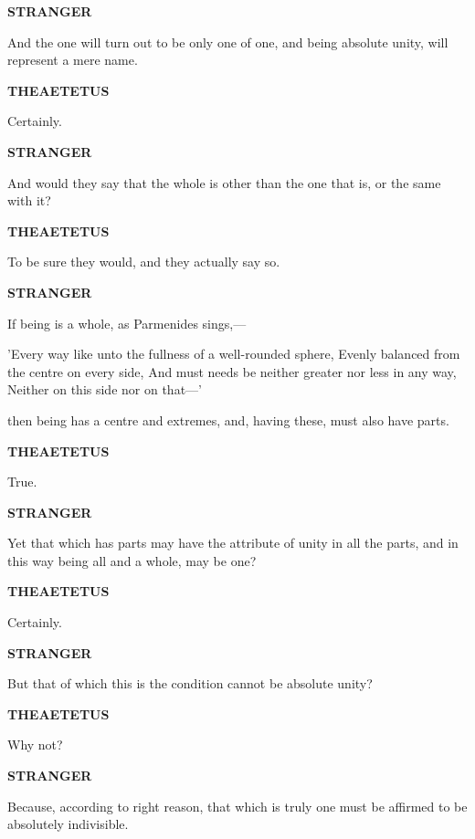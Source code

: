 \documentclass[11pt,letter]{article}
\begin{document}
\par \textbf{STRANGER}
\par   And the one will turn out to be only one of one, and being absolute unity, will represent a mere name.

\par \textbf{THEAETETUS}
\par   Certainly.

\par \textbf{STRANGER}
\par   And would they say that the whole is other than the one that is, or the same with it?

\par \textbf{THEAETETUS}
\par   To be sure they would, and they actually say so.

\par \textbf{STRANGER}
\par   If being is a whole, as Parmenides sings,—

\par  'Every way like unto the fullness of a well-rounded sphere, Evenly balanced from the centre on every side, And must needs be neither greater nor less in any way, Neither on this side nor on that—'

\par  then being has a centre and extremes, and, having these, must also have parts.

\par \textbf{THEAETETUS}
\par   True.

\par \textbf{STRANGER}
\par   Yet that which has parts may have the attribute of unity in all the parts, and in this way being all and a whole, may be one?

\par \textbf{THEAETETUS}
\par   Certainly.

\par \textbf{STRANGER}
\par   But that of which this is the condition cannot be absolute unity?

\par \textbf{THEAETETUS}
\par   Why not?

\par \textbf{STRANGER}
\par   Because, according to right reason, that which is truly one must be affirmed to be absolutely indivisible.
\end{document}
